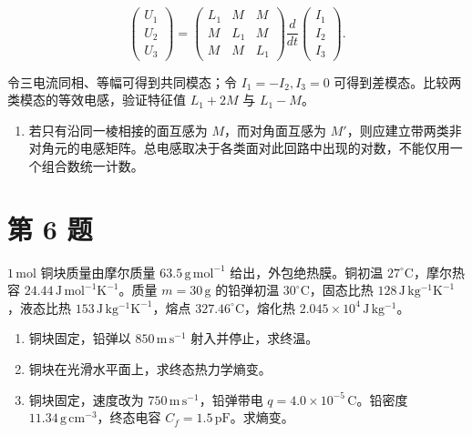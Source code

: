\documentclass[12pt,a4paper,UTF8]{ctexart}
\newcommand{\tightlist}{\setlength{\itemsep}{0pt}\setlength{\parskip}{0pt}}
\begin{document}
\[
\begin{pmatrix}U_1\\U_2\\U_3\end{pmatrix}
=
\begin{pmatrix}
L_1&M&M\\
M&L_1&M\\
M&M&L_1
\end{pmatrix}
\frac{d}{dt}
\begin{pmatrix}I_1\\I_2\\I_3\end{pmatrix}.
\]

令三电流同相、等幅可得到共同模态；令 \(I_1=-I_2,I_3=0\)
可得到差模态。比较两类模态的等效电感，验证特征值 \(L_1+2M\) 与
\(L_1-M\)。

\begin{enumerate}
\def\labelenumi{\arabic{enumi}.}
\setcounter{enumi}{4}
\tightlist
\item
  若只有沿同一棱相接的面互感为 \(M\)，而对角面互感为
  \(M'\)，则应建立带两类非对角元的电感矩阵。总电感取决于各类面对此回路中出现的对数，不能仅用一个组合数统一计数。
\end{enumerate}

\newpage

\section{第 6 题}\label{ux7b2c-6-ux9898}

\(1\,\mathrm{mol}\) 铜块质量由摩尔质量 \(63.5\,\mathrm{g\,mol^{-1}}\)
给出，外包绝热膜。铜初温 \(27^\circ\mathrm C\)，摩尔热容
\(24.44\,\mathrm{J\,mol^{-1}K^{-1}}\)。质量 \(m=30\,\mathrm g\)
的铅弹初温 \(30^\circ\mathrm C\)，固态比热
\(128\,\mathrm{J\,kg^{-1}K^{-1}}\)，液态比热
\(153\,\mathrm{J\,kg^{-1}K^{-1}}\)，熔点
\(327.46^\circ\mathrm C\)，熔化热
\(2.045\times10^4\,\mathrm{J\,kg^{-1}}\)。

\begin{enumerate}
\def\labelenumi{\arabic{enumi}.}
\tightlist
\item
  铜块固定，铅弹以 \(850\,\mathrm{m\,s^{-1}}\) 射入并停止，求终温。
\item
  铜块在光滑水平面上，求终态热力学熵变。
\item
  铜块固定，速度改为 \(750\,\mathrm{m\,s^{-1}}\)，铅弹带电
  \(q=4.0\times10^{-5}\,\mathrm C\)。铅密度
  \(11.34\,\mathrm{g\,cm^{-3}}\)，终态电容
  \(C_f=1.5\,\mathrm{pF}\)。求熵变。
\end{enumerate}
\end{document}
